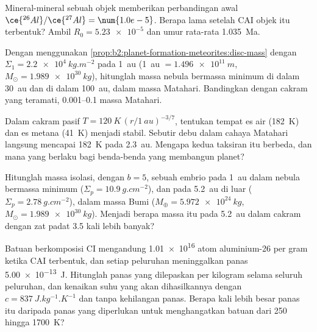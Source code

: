 \begin{exercise}[$\star$]\label{exo:b2:planet-formation-meteorites:4}
Mineral-mineral sebuah objek memberikan perbandingan awal
$\ce{^{26}Al}/\ce{^{27}Al} = \num{1.0e-5}$. Berapa lama setelah CAI objek itu terbentuk?
Ambil $R_0 = \num{5.23e-5}$ dan umur rata-rata \qty{1.035}{Ma}.
\end{exercise}

\begin{exercise}[$\star\star$]\label{exo:b2:planet-formation-meteorites:5}
Dengan menggunakan \cref{prop:b2:planet-formation-meteorites:disc-mass} dengan
$\Sigma_1 = \qty{2.2e4}{kg.m^{-2}}$ pada \qty{1}{au} (\qty{1}{au} $=
\qty{1.496e11}{m}$, $M_\odot = \qty{1.989e30}{kg}$), hitunglah massa
nebula bermassa minimum di dalam \qty{30}{au} dan di dalam \qty{100}{au}, dalam massa
Matahari. Bandingkan dengan cakram yang teramati, \numrange{0.001}{0.1} massa Matahari.
\end{exercise}

\begin{exercise}[$\star\star$]\label{exo:b2:planet-formation-meteorites:6}
Dalam cakram pasif $T = \qty{120}{K}\,(r/\qty{1}{au})^{-3/7}$, tentukan tempat es
air (\qty{182}{K}) dan es metana (\qty{41}{K}) menjadi stabil. Sebutir debu dalam cahaya
Matahari langsung mencapai \qty{182}{K} pada \qty{2.3}{au}. Mengapa kedua taksiran
 itu berbeda, dan mana yang berlaku bagi benda-benda yang membangun planet?
\end{exercise}

\begin{exercise}[$\star\star$]\label{exo:b2:planet-formation-meteorites:7}
Hitunglah massa isolasi, dengan $b = 5$, sebuah embrio pada \qty{1}{au} dalam
nebula bermassa minimum ($\Sigma_p = \qty{10.9}{g.cm^{-2}}$), dan pada \qty{5.2}{au}
di luar  ($\Sigma_p = \qty{2.78}{g.cm^{-2}}$), dalam massa Bumi
($M_\oplus = \qty{5.972e24}{kg}$, $M_\odot = \qty{1.989e30}{kg}$). Menjadi berapa
massa itu pada \qty{5.2}{au} dalam cakram dengan zat padat \num{3.5} kali lebih banyak?
\end{exercise}

\begin{exercise}[$\star\star$]\label{exo:b2:planet-formation-meteorites:8}
Batuan berkomposisi CI mengandung \num{1.01e16} atom aluminium-26 per gram ketika
CAI terbentuk, dan setiap peluruhan meninggalkan panas \qty{5.00e-13}{J}. Hitunglah
panas yang dilepaskan per kilogram selama seluruh peluruhan, dan kenaikan suhu yang
akan dihasilkannya dengan $c = \qty{837}{J.kg^{-1}.K^{-1}}$ dan tanpa kehilangan panas. Berapa kali
lebih besar panas itu daripada panas yang diperlukan untuk menghangatkan batuan dari \num{250} hingga
\qty{1700}{K}?
\end{exercise}

